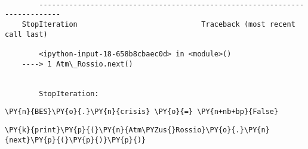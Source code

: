 \par\vspace{1\smallerfontscale}%
    \begin{addmargin}[\cellleftmargin]{0em}%
    {\smaller%
    \vspace{-1\smallerfontscale}%
    
    \begin{Verbatim}[commandchars=\\\{\}]

        ---------------------------------------------------------------------------
    StopIteration                             Traceback (most recent call last)

        <ipython-input-18-658b8cbaec0d> in <module>()
    ----> 1 Atm\_Rossio.next()
    

        StopIteration: 

    \end{Verbatim}
}%
    \end{addmargin}%

{\par%
\vspace{-1\baselineskip}%
}%
\begin{notebookcell}[19]%
\begin{addmargin}[\cellleftmargin]{0em}%
{\smaller%
\par%
%
\vspace{-1\smallerfontscale}%
\begin{Verbatim}[commandchars=\\\{\}]
\PY{n}{BES}\PY{o}{.}\PY{n}{crisis} \PY{o}{=} \PY{n+nb+bp}{False}
\end{Verbatim}
%
\par%
\vspace{-1\smallerfontscale}}%
\end{addmargin}
\end{notebookcell}



{\par%
\vspace{-1\baselineskip}%
}%
\begin{notebookcell}[20]%
\begin{addmargin}[\cellleftmargin]{0em}%
{\smaller%
\par%
%
\vspace{-1\smallerfontscale}%
\begin{Verbatim}[commandchars=\\\{\}]
\PY{k}{print}\PY{p}{(}\PY{n}{Atm\PYZus{}Rossio}\PY{o}{.}\PY{n}{next}\PY{p}{(}\PY{p}{)}\PY{p}{)}
\end{Verbatim}
%
\par%
\vspace{-1\smallerfontscale}}%
\end{addmargin}
\end{notebookcell}

